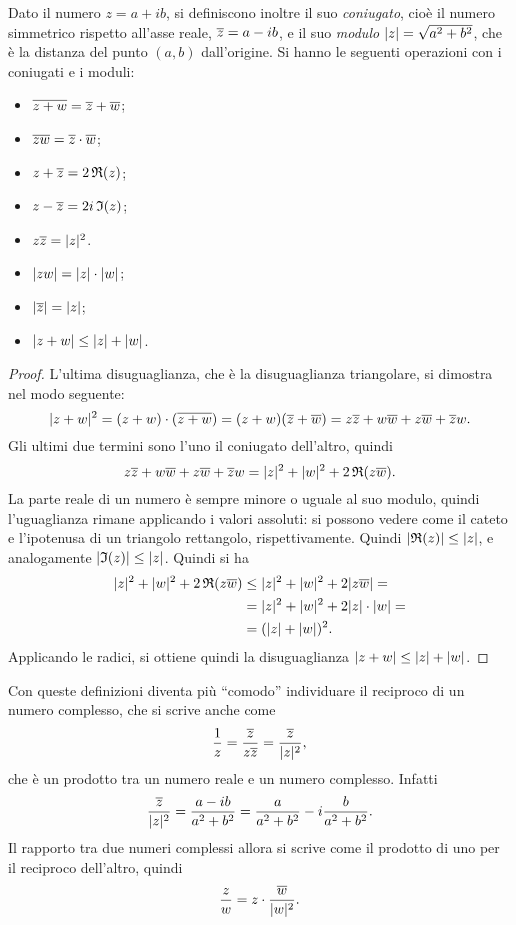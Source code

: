 Dato il numero $z=a+ib$, si definiscono inoltre il suo \emph{coniugato}, cioè il numero simmetrico rispetto all'asse reale, $\overline{z}=a-ib$, e il suo \emph{modulo} $\lvert z\rvert=\sqrt{a^2+b^2}$, che è la  distanza del punto $(a,b)$ dall'origine.
Si hanno le seguenti operazioni con i coniugati e i moduli:
\begin{itemize}
\item $\overline{z+w}=\overline{z}+\overline{w}$;
\item $\overline{zw}=\overline{z}\cdot\overline{w}$;
\item $z+\overline{z}=2\,\mathfrak{R}(z)$;
\item $z-\overline{z}= 2i\,\mathfrak{I}(z)$;
\item $z\overline{z}=\lvert z\rvert^2$.
\item $\lvert zw\rvert=\lvert z\rvert\cdot\lvert w\rvert$;
\item $\lvert\overline{z}\rvert=\lvert z\rvert$;
\item $\lvert z+w\rvert\leq\lvert z\rvert+\lvert w\rvert$.
\end{itemize}
\begin{proof}
L'ultima disuguaglianza, che è la disuguaglianza triangolare, si dimostra nel modo seguente:
\[
\lvert z+w\rvert^2=(z+w)\cdot(\overline{z+w})=(z+w)(\overline{z}+\overline{w})=z\overline{z}+w\overline{w}+z\overline{w}+\overline{z}w.
\]
Gli ultimi due termini sono l'uno il coniugato dell'altro, quindi
\[
z\overline{z}+w\overline{w}+z\overline{w}+\overline{z}w=\lvert z\rvert^2+\lvert w\rvert^2+2\,\mathfrak{R}(z\overline{w}).
\]
La parte reale di un numero è sempre minore o uguale al suo modulo, quindi l'uguaglianza rimane applicando i valori assoluti: si possono vedere come il cateto e l'ipotenusa di un triangolo rettangolo, rispettivamente. Quindi $\lvert\mathfrak{R}(z)\rvert\leq\lvert z\rvert$, e analogamente $\lvert\mathfrak{I}(z)\rvert\leq\lvert z\rvert$. Quindi si ha
\[
\begin{split}
\lvert z\rvert^2+\lvert w\rvert^2+2\,\mathfrak{R}(z\overline{w})&\leq\lvert z\rvert^2+\lvert w\rvert^2+2\lvert z\overline{w}\rvert=\\
&=\lvert z\rvert^2+\lvert w\rvert^2+2\lvert z\rvert\cdot\lvert w\rvert=\\
&=(\lvert z\rvert+\lvert w\rvert)^2.
\end{split}
\]
Applicando le radici, si ottiene quindi la disuguaglianza $\lvert z+w\rvert\leq\lvert z\rvert+\lvert w\rvert$.
\end{proof}
Con queste definizioni diventa più ``comodo'' individuare il reciproco di un numero complesso, che si scrive anche come
\[
\frac1{z}=\frac{\overline{z}}{z\overline{z}}=\frac{\overline{z}}{\lvert z\rvert^2},
\]
che è un prodotto tra un numero reale e un numero complesso.
Infatti
\[
\frac{\overline{z}}{\lvert z\rvert^2}=\frac{a-ib}{a^2+b^2}=\frac{a}{a^2+b^2}-i\frac{b}{a^2+b^2}.
\]
Il rapporto tra due numeri complessi allora si scrive come il prodotto di uno per il reciproco dell'altro, quindi
\[
\frac{z}{w}=z\cdot\frac{\overline{w}}{\lvert w\rvert^2}.
\]

